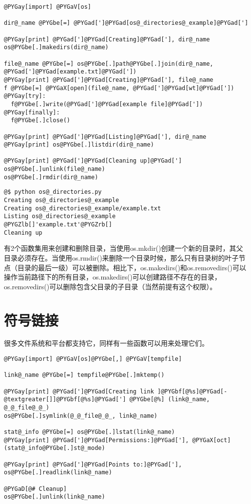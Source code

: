 \documentclass[a4paper,10pt,english]{manual}
\begin{document}
\begin{Verbatim}[commandchars=@\[\]]
@PYGay[import] @PYGaV[os]

dir@_name @PYGbe[=] @PYGad[']@PYGad[os@_directories@_example]@PYGad[']

@PYGay[print] @PYGad[']@PYGad[Creating]@PYGad['], dir@_name
os@PYGbe[.]makedirs(dir@_name)

file@_name @PYGbe[=] os@PYGbe[.]path@PYGbe[.]join(dir@_name, @PYGad[']@PYGad[example.txt]@PYGad['])
@PYGay[print] @PYGad[']@PYGad[Creating]@PYGad['], file@_name
f @PYGbe[=] @PYGaX[open](file@_name, @PYGad[']@PYGad[wt]@PYGad['])
@PYGay[try]:
  f@PYGbe[.]write(@PYGad[']@PYGad[example file]@PYGad['])
@PYGay[finally]:
  f@PYGbe[.]close()

@PYGay[print] @PYGad[']@PYGad[Listing]@PYGad['], dir@_name
@PYGay[print] os@PYGbe[.]listdir(dir@_name)

@PYGay[print] @PYGad[']@PYGad[Cleaning up]@PYGad[']
os@PYGbe[.]unlink(file@_name)
os@PYGbe[.]rmdir(dir@_name)
\end{Verbatim}

\begin{Verbatim}[commandchars=@\[\]]
@$ python os@_directories.py
Creating os@_directories@_example
Creating os@_directories@_example/example.txt
Listing os@_directories@_example
@PYGZlb[]'example.txt'@PYGZrb[]
Cleaning up
\end{Verbatim}

有2个函数集用来创建和删除目录，当使用os.mkdir()创建一个新的目录时，其父目录必须存在。当使用os.rmdir()来删除一个目录时候，那么只有目录树的叶子节点（目录的最后一级）可以被删除。相比下，os.makedirs()和os.removedirs()可以操作当前路径下的所有目录，os.makedirs()可以创建路径不存在的目录，os.removedirs()可以删除包含父目录的子目录（当然前提有这个权限）。


\section{符号链接}

很多文件系统和平台都支持它，同样有一些函数可以用来处理它们。

\begin{Verbatim}[commandchars=@\[\]]
@PYGay[import] @PYGaV[os]@PYGbe[,] @PYGaV[tempfile]

link@_name @PYGbe[=] tempfile@PYGbe[.]mktemp()

@PYGay[print] @PYGad[']@PYGad[Creating link ]@PYGbf[@%s]@PYGad[-@textgreater[]]@PYGbf[@%s]@PYGad['] @PYGbe[@%] (link@_name, @_@_file@_@_)
os@PYGbe[.]symlink(@_@_file@_@_, link@_name)

stat@_info @PYGbe[=] os@PYGbe[.]lstat(link@_name)
@PYGay[print] @PYGad[']@PYGad[Permissions:]@PYGad['], @PYGaX[oct](stat@_info@PYGbe[.]st@_mode)

@PYGay[print] @PYGad[']@PYGad[Points to:]@PYGad['], os@PYGbe[.]readlink(link@_name)

@PYGaD[@# Cleanup]
os@PYGbe[.]unlink(link@_name)
\end{Verbatim}
\end{document}
